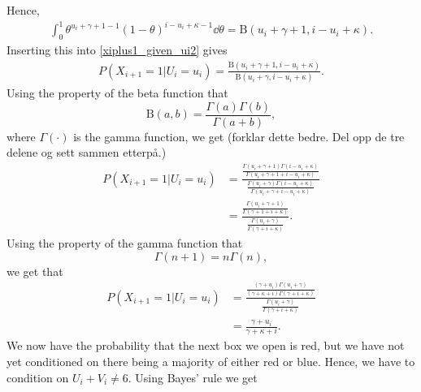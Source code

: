 Hence,
\begin{equation*}
    \begin{aligned}
        \int_0^1 \theta^{u_i+\gamma+1-1}(1-\theta)^{i-u_i+\kappa-1} \dd \theta = \text{B}(u_i+\gamma+1,i-u_i+\kappa).
    \end{aligned}
\end{equation*}
Inserting this into \eqref{xiplus1_given_ui2} gives
\begin{equation*}
    \begin{aligned}
        P(X_{i+1}=1|U_i=u_i) 
        = \frac{\text{B}(u_i+\gamma+1,i-u_i+\kappa)}
        {\text{B}(u_i+\gamma,i-u_i+\kappa)}.
    \end{aligned}
\end{equation*}
Using the property of the beta function that
\begin{equation*}
    \text{B}(a,b) = \frac{\Gamma(a)\Gamma(b)}{\Gamma(a+b)},
\end{equation*}
where $\Gamma(\cdot)$ is the gamma function, we get (forklar dette bedre. Del opp de tre delene og sett sammen etterpå.)
\begin{equation*}
    \begin{aligned}
        P(X_{i+1}=1|U_i=u_i) 
        &= \frac{\frac{\Gamma(u_i+\gamma+1)\Gamma(i-u_i+\kappa)}{\Gamma(u_i+\gamma+1+i-u_i+\kappa)}}
        {\frac{\Gamma(u_i+\gamma)\Gamma(i-u_i+\kappa)}{\Gamma(u_i+\gamma+i-u_i+\kappa)}} \\[6pt]
        &= \frac{\frac{\Gamma(u_i+\gamma+1)}{\Gamma(\gamma+1+i+\kappa)}}
        {\frac{\Gamma(u_i+\gamma)}{\Gamma(\gamma+i+\kappa)}}.
    \end{aligned}
\end{equation*}
Using the property of the gamma function that
\begin{equation*}
    \Gamma(n+1) = n\Gamma(n),
\end{equation*}
we get that 
\begin{equation}
\label{xiplus1_given_ui3}
    \begin{aligned}
        P(X_{i+1}=1|U_i=u_i) 
        &= \frac{\frac{(\gamma+u_i)\Gamma(u_i+\gamma)}{(\gamma+\kappa+i)\Gamma(\gamma+i+\kappa)}}
        {\frac{\Gamma(u_i+\gamma)}{\Gamma(\gamma+i+\kappa)}}\\[6pt]
        &=\frac{\gamma+u_i}
        {\gamma+\kappa+i}.
    \end{aligned}
\end{equation}
We now have the probability that the next box we open is red, but we have not yet conditioned on there being a majority of either red or blue. Hence, we have to condition on $U_i+V_i\neq6$. Using Bayes' rule we get
